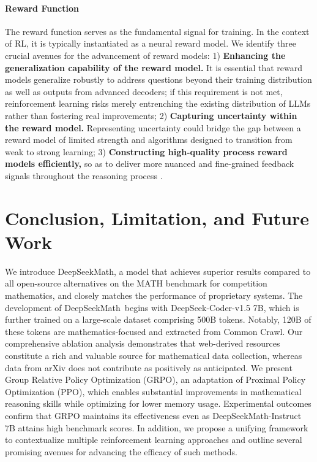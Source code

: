 \paragraph{Reward Function} The reward function serves as the fundamental signal for training. In the context of RL, it is typically instantiated as a neural reward model. We identify three crucial avenues for the advancement of reward models: 1) \textbf{Enhancing the generalization capability of the reward model.} It is essential that reward models generalize robustly to address questions beyond their training distribution as well as outputs from advanced decoders; if this requirement is not met, reinforcement learning risks merely entrenching the existing distribution of LLMs rather than fostering real improvements; 2) \textbf{Capturing uncertainty within the reward model.} Representing uncertainty could bridge the gap between a reward model of limited strength and algorithms designed to transition from weak to strong learning; 3) \textbf{Constructing high-quality process reward models efficiently,} so as to deliver more nuanced and fine-grained feedback signals throughout the reasoning process \citep{lightman2023let,wang2023math}.

\section{Conclusion, Limitation, and Future Work} 

We introduce DeepSeekMath, a model that achieves superior results compared to all open-source alternatives on the MATH benchmark for competition mathematics, and closely matches the performance of proprietary systems. The development of DeepSeekMath~begins with DeepSeek-Coder-v1.5 7B, which is further trained on a large-scale dataset comprising 500B tokens. Notably, 120B of these tokens are mathematics-focused and extracted from Common Crawl. Our comprehensive ablation analysis demonstrates that web-derived resources constitute a rich and valuable source for mathematical data collection, whereas data from arXiv does not contribute as positively as anticipated. We present Group Relative Policy Optimization (GRPO), an adaptation of Proximal Policy Optimization (PPO), which enables substantial improvements in mathematical reasoning skills while optimizing for lower memory usage. Experimental outcomes confirm that GRPO maintains its effectiveness even as DeepSeekMath-Instruct 7B attains high benchmark scores. In addition, we propose a unifying framework to contextualize multiple reinforcement learning approaches and outline several promising avenues for advancing the efficacy of such methods.

